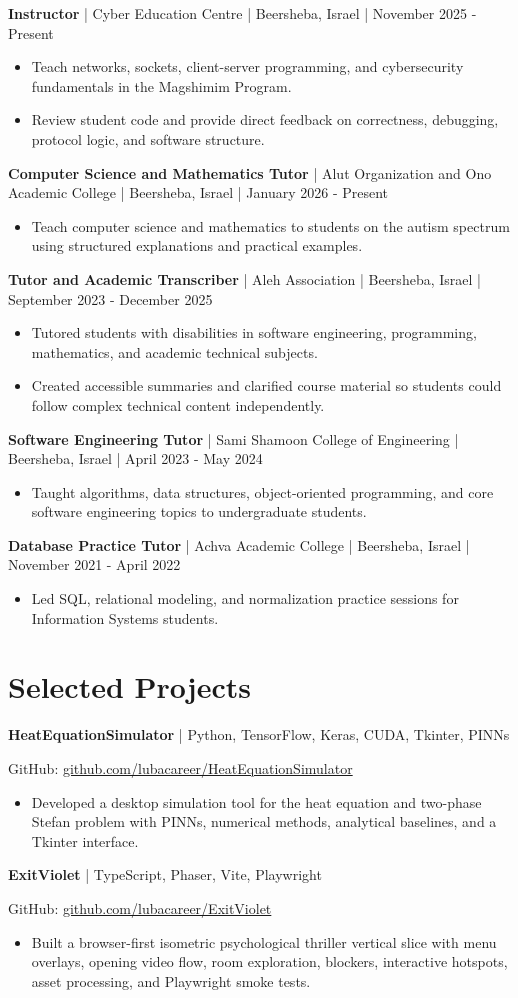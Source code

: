 \documentclass[11pt,a4paper]{article}
\newcommand{\workentry}[5]{%
  \Needspace{5\baselineskip}
  \textbf{#1} | #2 | #3 | #4\par
  \begin{itemize}
    #5
  \end{itemize}
}
\newcommand{\projectentry}[4]{%
  \Needspace{4\baselineskip}
  \textbf{#1} | #2\par
  GitHub: #3\par
  \begin{itemize}
    #4
  \end{itemize}
}
\begin{document}
\workentry{Instructor}{Cyber Education Centre}{Beersheba, Israel}{November 2025 - Present}{
  \item Teach networks, sockets, client-server programming, and cybersecurity fundamentals in the Magshimim Program.
  \item Review student code and provide direct feedback on correctness, debugging, protocol logic, and software structure.
}

\workentry{Computer Science and Mathematics Tutor}{Alut Organization and Ono Academic College}{Beersheba, Israel}{January 2026 - Present}{
  \item Teach computer science and mathematics to students on the autism spectrum using structured explanations and practical examples.
}

\workentry{Tutor and Academic Transcriber}{Aleh Association}{Beersheba, Israel}{September 2023 - December 2025}{
  \item Tutored students with disabilities in software engineering, programming, mathematics, and academic technical subjects.
  \item Created accessible summaries and clarified course material so students could follow complex technical content independently.
}

\workentry{Software Engineering Tutor}{Sami Shamoon College of Engineering}{Beersheba, Israel}{April 2023 - May 2024}{
  \item Taught algorithms, data structures, object-oriented programming, and core software engineering topics to undergraduate students.
}

\workentry{Database Practice Tutor}{Achva Academic College}{Beersheba, Israel}{November 2021 - April 2022}{
  \item Led SQL, relational modeling, and normalization practice sessions for Information Systems students.
}

\section*{Selected Projects}
\projectentry{HeatEquationSimulator}{Python, TensorFlow, Keras, CUDA, Tkinter, PINNs}{\href{https://github.com/lubacareer/HeatEquationSimulator}{github.com/lubacareer/HeatEquationSimulator}}{
  \item Developed a desktop simulation tool for the heat equation and two-phase Stefan problem with PINNs, numerical methods, analytical baselines, and a Tkinter interface.
}

\projectentry{ExitViolet}{TypeScript, Phaser, Vite, Playwright}{\href{https://github.com/lubacareer/ExitViolet}{github.com/lubacareer/ExitViolet}}{
  \item Built a browser-first isometric psychological thriller vertical slice with menu overlays, opening video flow, room exploration, blockers, interactive hotspots, asset processing, and Playwright smoke tests.
}
\end{document}
